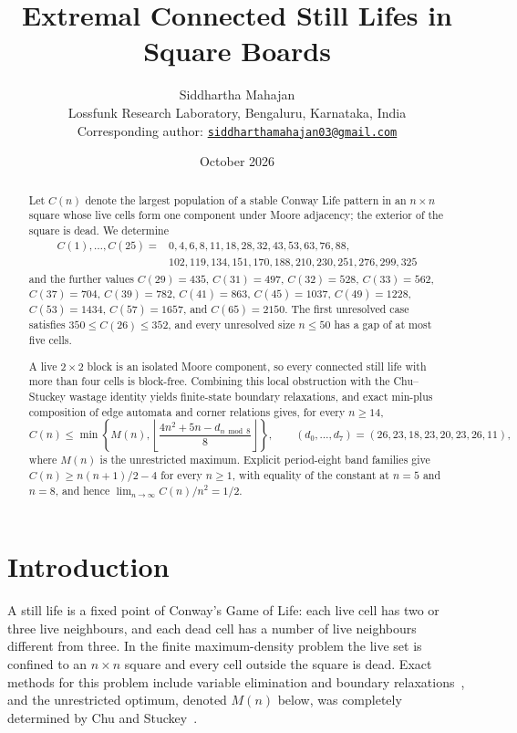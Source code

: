 \documentclass[10pt]{article}
\title{\bfseries Extremal Connected Still Lifes in Square Boards}
\author{
Siddhartha Mahajan\\[5pt]
\small Lossfunk Research Laboratory, Bengaluru, Karnataka, India\\[4pt]
\scriptsize Corresponding author: \href{mailto:siddharthamahajan03@gmail.com}{\texttt{siddharthamahajan03@gmail.com}}
}
\date{October 2026}
\theoremstyle{remark}
\begin{document}
\maketitle

\begin{abstract}
Let $C(n)$ denote the largest population of a stable Conway Life pattern in an
$n\times n$ square whose live cells form one component under Moore adjacency;
the exterior of the square is dead.  We determine
\[
\begin{aligned}
C(1),\ldots,C(25)={}&0,4,6,8,11,18,28,32,43,53,63,76,88,\\
&102,119,134,151,170,188,210,230,251,276,299,325
\end{aligned}
\]
and the further values $C(29)=435$, $C(31)=497$, $C(32)=528$,
$C(33)=562$, $C(37)=704$, $C(39)=782$, $C(41)=863$, $C(45)=1037$,
$C(49)=1228$, $C(53)=1434$, $C(57)=1657$, and $C(65)=2150$.  The first
unresolved case satisfies $350\le C(26)\le352$, and every unresolved size
$n\le50$ has a gap of at most five cells.

A live $2\times2$ block is an isolated Moore component, so every connected
still life with more than four cells is block-free.  Combining this local
obstruction with the Chu--Stuckey wastage identity yields finite-state
boundary relaxations, and exact min-plus composition of edge automata and
corner relations gives, for every $n\ge14$,
\[
 C(n)\le \min\!\left\{M(n),
 \left\lfloor\frac{4n^2+5n-d_{n\bmod8}}8\right\rfloor\right\},
 \qquad
 (d_0,\ldots,d_7)=(26,23,18,23,20,23,26,11),
\]
where $M(n)$ is the unrestricted maximum.  Explicit period-eight band
families give $C(n)\ge n(n+1)/2-4$ for every $n\ge1$, with equality of the
constant at $n=5$ and $n=8$, and hence $\lim_{n\to\infty}C(n)/n^2=1/2$.
\end{abstract}

\section{Introduction}

A still life is a fixed point of Conway's Game of Life: each live cell has two
or three live neighbours, and each dead cell has a number of live neighbours
different from three.  In the finite maximum-density problem the live set is
confined to an $n\times n$ square and every cell outside the square is dead.
Exact methods for this problem include variable elimination and boundary
relaxations~\cite{larrosa-2005,chu-stuckey-garcia-2009}, and the unrestricted
optimum, denoted $M(n)$ below, was completely determined by Chu and
Stuckey~\cite{chu-stuckey-2012}.
\end{document}

